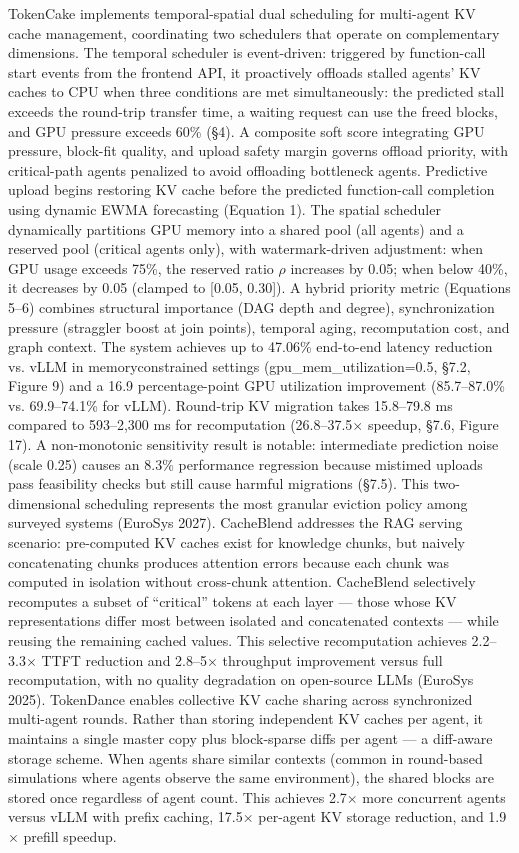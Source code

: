 \documentclass[preprint,12pt]{elsarticle}
\begin{document}
TokenCake \cite{v5ref4} implements temporal-spatial dual scheduling for multi-agent KV cache management, coordinating two schedulers that operate on complementary dimensions. The temporal scheduler is event-driven: triggered by function-call start events from the frontend API, it proactively offloads stalled agents' KV caches to CPU when three conditions are met simultaneously: the predicted stall exceeds the round-trip transfer time, a waiting request can use the freed blocks, and GPU pressure exceeds 60\% (\S{}4). A composite soft score integrating GPU pressure, block-fit quality, and upload safety margin governs offload priority, with critical-path agents penalized to avoid offloading bottleneck agents. Predictive upload begins restoring KV cache before the predicted function-call completion using dynamic EWMA forecasting (Equation 1). The spatial scheduler dynamically partitions GPU memory into a shared pool (all agents) and a reserved pool (critical agents only), with watermark-driven adjustment: when GPU usage exceeds 75\%, the reserved ratio $\rho$ increases by 0.05; when below 40\%, it decreases by 0.05 (clamped to [0.05, 0.30]). A hybrid priority metric (Equations 5--6) combines structural importance (DAG depth and degree), synchronization pressure (straggler boost at join points), temporal aging, recomputation cost, and graph context. The system achieves up to 47.06\% end-to-end latency reduction vs. vLLM in memoryconstrained settings (gpu\_mem\_utilization=0.5, \S{}7.2, Figure 9) and a 16.9 percentage-point GPU utilization improvement (85.7--87.0\% vs. 69.9--74.1\% for vLLM). Round-trip KV migration takes 15.8--79.8 ms compared to 593--2,300 ms for recomputation (26.8--37.5$\times$ speedup, \S{}7.6, Figure 17). A non-monotonic sensitivity result is notable: intermediate prediction noise (scale 0.25) causes an 8.3\% performance regression because mistimed uploads pass feasibility checks but still cause harmful migrations (\S{}7.5). This two-dimensional scheduling represents the most granular eviction policy among surveyed systems (EuroSys 2027). CacheBlend \cite{v5ref41} addresses the RAG serving scenario: pre-computed KV caches exist for knowledge chunks, but naively concatenating chunks produces attention errors because each chunk was computed in isolation without cross-chunk attention. CacheBlend selectively recomputes a subset of ``critical'' tokens at each layer --- those whose KV representations differ most between isolated and concatenated contexts --- while reusing the remaining cached values. This selective recomputation achieves 2.2--3.3$\times$ TTFT reduction and 2.8--5$\times$ throughput improvement versus full recomputation, with no quality degradation on open-source LLMs (EuroSys 2025). TokenDance enables collective KV cache sharing across synchronized multi-agent rounds. Rather than storing independent KV caches per agent, it maintains a single master copy plus block-sparse diffs per agent --- a diff-aware storage scheme. When agents share similar contexts (common in round-based simulations where agents observe the same environment), the shared blocks are stored once regardless of agent count. This achieves 2.7$\times$ more concurrent agents versus vLLM with prefix caching, 17.5$\times$ per-agent KV storage reduction, and 1.9$\times$ prefill speedup. 
\end{document}
